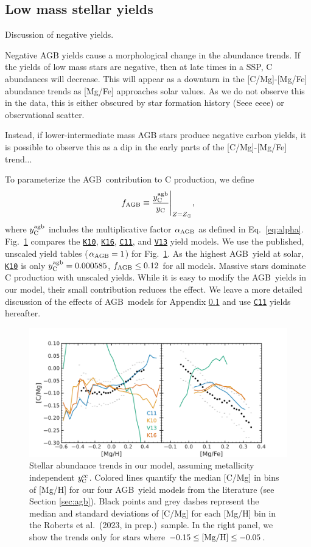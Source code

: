 \documentclass[fleqn,usenatbib]{mnras}
\newcommand{\citetjack}{Roberts et al.~(2023, in prep.)}
\newcommand{\cxi}{\texttt{\hyperlink{C11}{C11}}}
\newcommand{\kx}{\texttt{\hyperlink{K10}{K10}}}
\newcommand{\kxvi}{\texttt{\hyperlink{K16}{K16}}}
\newcommand{\vxiii}{\texttt{\hyperlink{V13}{V13}}}
\newcommand{\agb}{AGB}
\newcommand{\caafe}{[C/Mg]-[Mg/Fe]}
\newcommand{\Yct}{\ensuremath{y_{\rm C}}}
\newcommand{\Ycc}{\ensuremath{y_{\rm C}^{\rm cc}}}
\newcommand{\Ycagb}{\ensuremath{y_{\rm C}^{\rm agb}}}
\begin{document}
\subsection{Low mass stellar yields}\label{sec:f-z-models}

Discussion of negative yields.

Negative AGB yields cause a morphological change in the abundance trends. If the yields of low mass stars are negative, then at late times in a SSP, C abundances will decrease. This will appear as a downturn in the \caafe{} abundance trends as [Mg/Fe] approaches solar values. As we do not observe this in the data, this is either obscured by star formation history (Seee eeee) or observational scatter. 

Instead, if lower-intermediate mass AGB stars produce negative carbon yields, it is possible to observe this as a dip in the early parts of the \caafe{} trend...

To parameterize the \agb\ contribution to C production, we define 
\begin{equation}\label{eq:f_agb}
    f_{\rm AGB} \equiv \frac{\Ycagb}{\Yct}\Bigg\vert_{Z=Z_\odot},
\end{equation}
where  $\Ycagb$ includes the multiplicative factor $\alpha_{\rm AGB}$ as defined in Eq.~\ref{eq:alpha}.
Fig.~\ref{fig:agb_sims} compares the \kx{}, \kxvi{}, \cxi{}, and \vxiii{} yield models. We use the published, unscaled yield tables ($\alpha_{\rm AGB}=1$) for Fig.~\ref{fig:agb_sims}. As the highest \agb\ yield at solar, \kx{} is only $\Ycagb=0.000585$, $f_{\rm AGB} \leq 0.12$ for all models. Massive stars dominate C production with unscaled yields.  While it is easy to modify the \agb\ yields in our model, their small contribution reduces the effect. We leave a more detailed discussion of the effects of \agb\ models for Appendix \ref{sec:f-z-models} and use \cxi{} yields hereafter.

\begin{figure}
\centering
\includegraphics{agb_oob.pdf}
\caption[Median Stellar Abundance Trends]{
    Stellar abundance trends in our model, assuming metallicity independent $\Ycc$. Colored lines quantify the median [C/Mg] in bins of [Mg/H] for our four \agb\ yield models from the literature (see Section \ref{sec:agb}). Black points and grey dashes represent the median and standard deviations of [C/Mg] for each [Mg/H] bin in the \citetjack~sample. In the right panel, we show the trends only for stars where $-0.15\leq {\rm [Mg/H]}\leq -0.05$.
}
\label{fig:agb_sims}
\end{figure}
\end{document}
